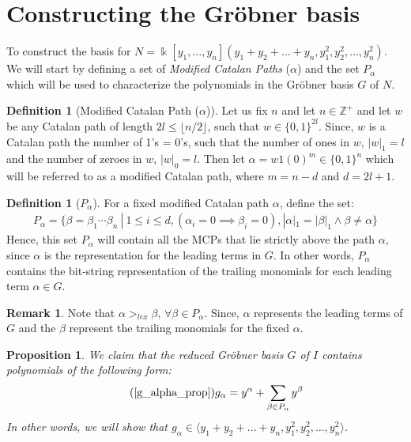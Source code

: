 \documentclass[12pt,reqno]{amsart}
\theoremstyle{plain}
\newtheorem{proposition}[theorem]{Proposition}
\theoremstyle{definition}
\newtheorem{remark}[theorem]{Remark}
\newtheorem{definition}[theorem]{Definition}
\def\field{\Bbbk}
\def\ideal{\langle y_1 + y_2 + \dots + y_n, y^2_1, y^2_2, \dots , y^2_n \rangle}
\begin{document}
\section{Constructing the Gr\"obner basis}

To construct the basis for $N = \field[y_1, \dots, y_n](y_1 + y_2 + \dots + y_n, y^2_1, y^2_2, \dots , y^2_n)$.
We will start by defining a set of \textit{Modified Catalan Paths} ($\alpha$) and the set $P_{\alpha}$ which will be used to characterize the polynomials in the Gr\"obner basis $G$ of $N$.

\begin{definition}[Modified Catalan Path ($\alpha$)] \label{alpha}
	Let us fix $n$ and let $n \in \mathbb{Z}^{+}$ and let $w$ be any Catalan path of length $2l \leq \lfloor n/2 \rfloor$, 
	such that $w \in \{0,1\}^{2l}$. Since, $w$ is a Catalan path the number of 1's = 0's, such that the number of 
	ones in $w$, $|w|_1 = l$ and the number of zeroes in $w$, $|w|_0 = l$.  Then let $\alpha = w 1(0)^m \in \{0,1\}^n$ which will be referred to as a modified Catalan path, where $m = n - d$ and $d = 2l + 1$.
\end{definition}


\begin{definition}[$P_{\alpha}$] \label{p_alpha}
	For a fixed modified Catalan path $\alpha$, define the set:
	\begin{align*}
		P_{\alpha} = \{ \beta = \beta_1 \cdots \beta_n \ | \ 1 \leq i \leq d, (\alpha_i = 0 \implies
		\beta_i = 0), |\alpha|_1 = |\beta|_1 \wedge \beta \neq \alpha \}
	\end{align*}
	Hence, this set $P_{\alpha}$ will contain all the MCPs that lie strictly above the path $\alpha$, since
	$\alpha$ is the representation for the leading terms in $G$. In other words, $P_{\alpha}$ contains
	the bit-string representation of the trailing monomials for each leading term $\alpha \in G$.
\end{definition}
\begin{remark}
    Note that $\alpha >_{lex} \beta$,  $\forall \beta \in P_{\alpha}$. Since, $\alpha$ represents the leading terms of $G$ 
    and the $\beta$ represent the trailing monomials for the fixed $\alpha$.
\end{remark}

\begin{proposition}
	\label{g_alpha_prop}
	We claim that the reduced Gr\"obner basis $G$ of $I$ contains polynomials of the following form:
	\begin{equation}
		\tag{\ref*{g_alpha_prop}}
		g_{\alpha} = y^{\alpha} + \sum_{\beta \in P_{\alpha}} y^{\beta}
	\end{equation}
	In other words, we will show that $g_\alpha \in \ideal$. 
\end{proposition}
\end{document}
